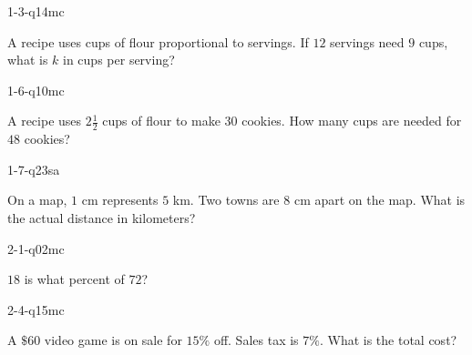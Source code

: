 
\begin{practiceQuestion}{1-3-q14}{mc}
\begin{questionText}
A recipe uses cups of flour proportional to servings. If $12$ servings need $9$ cups, what is $k$ in cups per serving?
\end{questionText}
\end{practiceQuestion}

\begin{practiceQuestion}{1-6-q10}{mc}
\begin{questionText}
A recipe uses $2\frac{1}{2}$ cups of flour to make $30$ cookies. How many cups are needed for $48$ cookies?
\end{questionText}
\end{practiceQuestion}

\begin{practiceQuestion}{1-7-q23}{sa}
\begin{questionText}
On a map, $1$ cm represents $5$ km. Two towns are $8$ cm apart on the map. What is the actual distance in kilometers?
\end{questionText}
\end{practiceQuestion}

\begin{practiceQuestion}{2-1-q02}{mc}
\begin{questionText}
$18$ is what percent of $72$?
\end{questionText}
\end{practiceQuestion}

\begin{practiceQuestion}{2-4-q15}{mc}
\begin{questionText}
A $\$60$ video game is on sale for $15\%$ off. Sales tax is $7\%$. What is the total cost?
\end{questionText}
\end{practiceQuestion}

